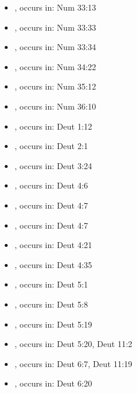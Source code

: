 \documentclass[14pt]{article}
\begin{document}
\begin{itemize}
\item {}, occurs in: Num 33:13

\item {}, occurs in: Num 33:33

\item {}, occurs in: Num 33:34

\item {}, occurs in: Num 34:22

\item {}, occurs in: Num 35:12

\item {}, occurs in: Num 36:10

\item {}, occurs in: Deut 1:12

\item {}, occurs in: Deut 2:1

\item {}, occurs in: Deut 3:24

\item {}, occurs in: Deut 4:6

\item {}, occurs in: Deut 4:7

\item {}, occurs in: Deut 4:7

\item {}, occurs in: Deut 4:21

\item {}, occurs in: Deut 4:35

\item {}, occurs in: Deut 5:1

\item {}, occurs in: Deut 5:8

\item {}, occurs in: Deut 5:19

\item {}, occurs in: Deut 5:20, Deut 11:2

\item {}, occurs in: Deut 6:7, Deut 11:19

\item {}, occurs in: Deut 6:20


\end{itemize}
\end{document}
